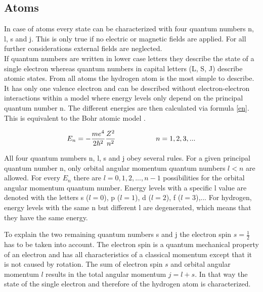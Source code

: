 \documentclass[parskip,12pt,headsepline,a4paper] {scrbook}
\begin{document}
\subsection{Atoms}
\vspace{-1\baselineskip}
In case of atoms every state can be characterized with four quantum numbers n, l, s and j. This is only true if no electric or magnetic fields are applied. For all further considerations external fields are neglected. \\
If quantum numbers are written in lower case letters they describe the state of a single electron whereas quantum numbers in capital letters (L, S, J) describe atomic states.
From all atoms the hydrogen atom is the most simple to describe. It has only one valence electron and can be described without electron-electron interactions within a model where energy levels only depend on the principal quantum number n. The different energies are then calculated via formula \ref{en}. This is equivalent to the Bohr atomic model \cite{vdl-fqm}.

\begin{align}  \label{en}
E_n = - \frac{m e^4}{2 \hbar^2} \frac{Z^2}{n^2} \hspace{2 cm} n = 1,2,3,...
\end{align}

All four quantum numbers n, l, s and j obey several rules. For a given principal quantum number n, only orbital angular momentum quantum numbers $l < n$ are allowed. For every $E_n$ there are $l=0,1,2,...,n-1$ possibilities for the orbital angular momentum quantum number. Energy levels with a specific l value are denoted with the letters s ($l=0$), p ($l=1$), d ($l=2$), f ($l=3$),... For hydrogen, energy levels with the same n but different l are degenerated, which means that they have the same energy.

To explain the two remaining quantum numbers s and j the electron spin $s= \frac{1}{2}$ has to be taken into account. The electron spin is a quantum mechanical property of an electron and has all characteristics of a classical momentum except that it is not caused by rotation. The sum of electron spin $s$ and orbital angular momentum $l$ results in the total angular momentum $j = l + s$. In that way the state of the single electron and therefore of the hydrogen atom is characterized.
\end{document}
